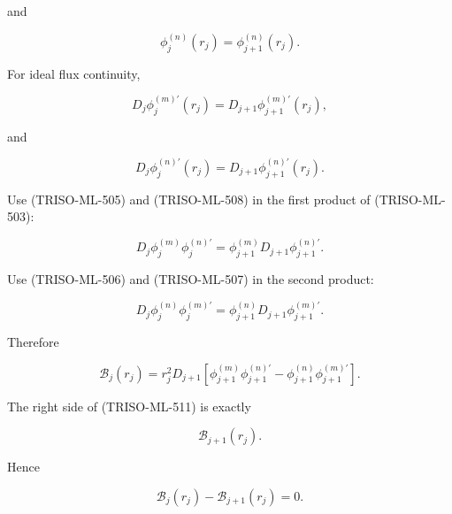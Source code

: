 \documentclass[11pt,a4paper]{article}
\begin{document}
and

\begin{equation}
\phi_j^{(n)}(r_j)
=
\phi_{j+1}^{(n)}(r_j).
\tag{TRISO-ML-506}
\label{eq:triso-ml-506}
\end{equation}

For ideal flux continuity,

\begin{equation}
D_j\phi_j^{(m)\prime}(r_j)
=
D_{j+1}\phi_{j+1}^{(m)\prime}(r_j),
\tag{TRISO-ML-507}
\label{eq:triso-ml-507}
\end{equation}

and

\begin{equation}
D_j\phi_j^{(n)\prime}(r_j)
=
D_{j+1}\phi_{j+1}^{(n)\prime}(r_j).
\tag{TRISO-ML-508}
\label{eq:triso-ml-508}
\end{equation}

Use (TRISO-ML-505) and (TRISO-ML-508) in the first product of (TRISO-ML-503):

\begin{equation}
D_j
\phi_j^{(m)}
\phi_j^{(n)\prime}
=
\phi_{j+1}^{(m)}
D_{j+1}\phi_{j+1}^{(n)\prime}.
\tag{TRISO-ML-509}
\label{eq:triso-ml-509}
\end{equation}

Use (TRISO-ML-506) and (TRISO-ML-507) in the second product:

\begin{equation}
D_j
\phi_j^{(n)}
\phi_j^{(m)\prime}
=
\phi_{j+1}^{(n)}
D_{j+1}\phi_{j+1}^{(m)\prime}.
\tag{TRISO-ML-510}
\label{eq:triso-ml-510}
\end{equation}

Therefore

\begin{equation}
\mathcal B_j(r_j)
=
r_j^2D_{j+1}
\left[
\phi_{j+1}^{(m)}
\phi_{j+1}^{(n)\prime}
-
\phi_{j+1}^{(n)}
\phi_{j+1}^{(m)\prime}
\right].
\tag{TRISO-ML-511}
\label{eq:triso-ml-511}
\end{equation}

The right side of (TRISO-ML-511) is exactly

\begin{equation}
\mathcal B_{j+1}(r_j).
\tag{TRISO-ML-512}
\label{eq:triso-ml-512}
\end{equation}

Hence

\begin{equation}
\boxed{
\mathcal B_j(r_j)-\mathcal B_{j+1}(r_j)=0.
}
\tag{TRISO-ML-513}
\label{eq:triso-ml-513}
\end{equation}
\end{document}

